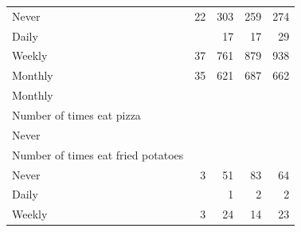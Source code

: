 \documentclass{article}
\begin{document}
\begin{table}[!h]
{\begin{tabular}{lllll}
			\multicolumn{1}{l}{\hspace{5em}Never} &
			\multicolumn{1}{|r}{22} &
			\multicolumn{1}{r}{303} &
			\multicolumn{1}{r}{259} &
			\multicolumn{1}{r}{274} \\
			\multicolumn{1}{l}{\hspace{5em}Daily} &
			\multicolumn{1}{|r}{} &
			\multicolumn{1}{r}{17} &
			\multicolumn{1}{r}{17} &
			\multicolumn{1}{r}{29} \\
			\multicolumn{1}{l}{\hspace{5em}Weekly} &
			\multicolumn{1}{|r}{37} &
			\multicolumn{1}{r}{761} &
			\multicolumn{1}{r}{879} &
			\multicolumn{1}{r}{938} \\
			\multicolumn{1}{l}{\hspace{5em}Monthly} &
			\multicolumn{1}{|r}{35} &
			\multicolumn{1}{r}{621} &
			\multicolumn{1}{r}{687} &
			\multicolumn{1}{r}{662} \\
			\multicolumn{1}{l}{\hspace{1em}Monthly} &
			\multicolumn{1}{|r}{} &
			\multicolumn{1}{r}{} &
			\multicolumn{1}{r}{} &
			\multicolumn{1}{r}{} \\
			\multicolumn{1}{l}{\hspace{2em}Number of times eat pizza} &
			\multicolumn{1}{|r}{} &
			\multicolumn{1}{r}{} &
			\multicolumn{1}{r}{} &
			\multicolumn{1}{r}{} \\
			\multicolumn{1}{l}{\hspace{3em}Never} &
			\multicolumn{1}{|r}{} &
			\multicolumn{1}{r}{} &
			\multicolumn{1}{r}{} &
			\multicolumn{1}{r}{} \\
			\multicolumn{1}{l}{\hspace{4em}Number of times eat fried potatoes} &
			\multicolumn{1}{|r}{} &
			\multicolumn{1}{r}{} &
			\multicolumn{1}{r}{} &
			\multicolumn{1}{r}{} \\
			\multicolumn{1}{l}{\hspace{5em}Never} &
			\multicolumn{1}{|r}{3} &
			\multicolumn{1}{r}{51} &
			\multicolumn{1}{r}{83} &
			\multicolumn{1}{r}{64} \\
			\multicolumn{1}{l}{\hspace{5em}Daily} &
			\multicolumn{1}{|r}{} &
			\multicolumn{1}{r}{1} &
			\multicolumn{1}{r}{2} &
			\multicolumn{1}{r}{2} \\
			\multicolumn{1}{l}{\hspace{5em}Weekly} &
			\multicolumn{1}{|r}{3} &
			\multicolumn{1}{r}{24} &
			\multicolumn{1}{r}{14} &
			\multicolumn{1}{r}{23} \\

\end{tabular}}
\end{table}
\end{document}
